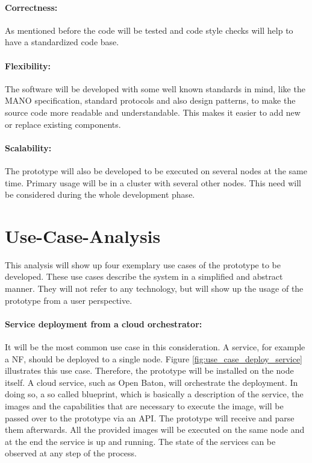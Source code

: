 \paragraph{Correctness:} As mentioned before the code will be tested and code style checks will help to have a standardized code base.
\paragraph{Flexibility:} The software will be developed with some well known standards in mind, like the \ac{MANO} specification, standard protocols and also design patterns, to make the source code more readable and understandable.
This makes it easier to add new or replace existing components.
\paragraph{Scalability:} The prototype will also be developed to be executed on several nodes at the same time.
Primary usage will be in a cluster with several other nodes.
This need will be considered during the whole development phase.


\section{Use-Case-Analysis}
\label{section:use-case-analysis}
This analysis will show up four exemplary use cases of the prototype to be developed.
These use cases describe the system in a simplified and abstract manner.
They will not refer to any technology, but will show up the usage of the prototype from a user perspective.

\paragraph{Service deployment from a cloud orchestrator:}
It will be the most common use case in this consideration.
A service, for example a \ac{NF}, should be deployed to a single node.
Figure \ref{fig:use_case_deploy_service} illustrates this use case.
Therefore, the prototype will be installed on the node itself.
A cloud service, such as Open Baton, will orchestrate the deployment.
In doing so, a so called blueprint, which is basically a description of the service, the images and the capabilities that are necessary to execute the image, will be passed over to the prototype via an \ac{API}.
The prototype will receive and parse them afterwards.
All the provided images will be executed on the same node and at the end the service is up and running.
The state of the services can be observed at any step of the process.

